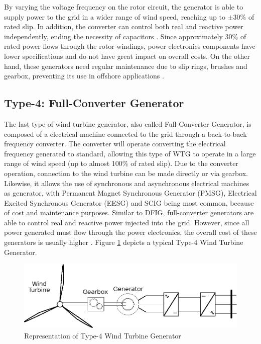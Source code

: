 By varying the voltage frequency on the rotor circuit, the generator is able to supply power to the grid in a wider range of wind speed, reaching up to $\pm 30\%$ of rated slip. In addition, the converter can control both real and reactive power independently, ending the necessity of capacitors \cite{Muljadi2010}. Since approximately 30\% of rated power flows through the rotor windings, power electronics components have lower specifications and do not have great impact on overall costs. On the other hand, these generators need regular maintenance due to slip rings, brushes and gearbox, preventing its use in offshore applications \cite{Yaramasu2015}.

\subsection{Type-4: Full-Converter Generator}

The last type of wind turbine generator, also called Full-Converter Generator, is composed of a electrical machine connected to the grid through a back-to-back frequency converter. The converter will operate converting the electrical frequency generated to standard, allowing this type of WTG to operate in a large range of wind speed (up to almost 100\% of rated slip). Due to the converter operation, connection to the wind turbine can be made directly or via gearbox. Likewise, it allows the use of synchronous and asynchronous electrical machines as generator, with Permanent Magnet Synchronous Generator (PMSG), Electrical Excited Synchronous Generator (EESG) and SCIG being most common, because of cost and maintenance purposes. Similar to DFIG, full-converter generators are able to control real and reactive power injected into the grid. However, since all power generated must flow through the power electronics, the overall cost of these generators is usually higher \cite{Yaramasu2015}. Figure \ref{fig: WTG4} depicts a typical Type-4 Wind Turbine Generator.

\begin{figure}[h]
	\caption{Representation of Type-4 Wind Turbine Generator}
	\begin{center}
		\includegraphics[scale=.8]{Images/Type4WTG.eps}
	\end{center}
	\label{fig: WTG4}
\end{figure}

